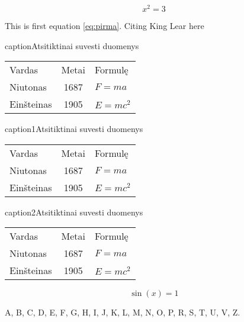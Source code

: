 \documentclass[12pt, a4paper, onecolumn, titlepage, oneside, intlimits]{report}
\begin{document}
\ktuinit{}    

\begin{equation}\label{eq:pirma}
x^2=3
\end{equation} 

This is first equation \ref{eq:pirma}. Citing King Lear here \cite{lear}

\begin{ktutable}{caption}{Atsitiktinai suvesti duomenys}
    \begin{tabular}{lcl}
      Vardas & Metai & Formulę \\
      Niutonas   & 1687 & $F = m a$ \\
      Einšteinas & 1905 & $E = m c^2$ \\
    \end{tabular}
\end{ktutable}

\begin{ktutable}{caption1}{Atsitiktinai suvesti duomenys}
    \begin{tabular}{lcl}
      Vardas & Metai & Formulę \\
      Niutonas   & 1687 & $F = m a$ \\
      Einšteinas & 1905 & $E = m c^2$ \\
    \end{tabular}
\end{ktutable}

\begin{ktutable}{caption2}{Atsitiktinai suvesti duomenys}
    \begin{tabular}{lcl}
      Vardas & Metai & Formulę \\
      Niutonas   & 1687 & $F = m a$ \\
      Einšteinas & 1905 & $E = m c^2$ \\
    \end{tabular}
\end{ktutable}
\newpage



\newpage 

\begin{equation}
\sin(x)=1 
\end{equation}


\begin{ktuliterature}
    \printbibliography{}
\end{ktuliterature}

\clearpage

\begin{ktuappendices}

A, B, C, D, E, F, G, H, I, J, K, L, M, N, O, P, R, S, T, U, V, Z.

\end{ktuappendices}
\end{document}
